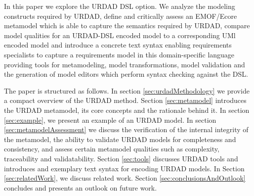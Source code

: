 In this paper we explore the URDAD DSL option. We analyze the modeling constructs required by URDAD, define and critically assess an EMOF/Ecore metamodel which is able to capture the semantics required by URDAD, compare model qualities for an URDAD-DSL encoded model to a corresponding UMl encoded model and introduce a concrete text syntax enabling requirements specialists to capture a requirements model in this domain-specific language providing tools for metamodeling, model transformations, model validation and the generation of model editors which perform syntax checking against the DSL.

The paper is structured as follows. In section \ref{sec:urdadMethodology} we provide a compact overview of the URDAD method. Section \ref{sec:metamodel} introduces the URDAD metamodel, its core concepts and the rationale behind it. In section \ref{sec:example}, we present an example of an URDAD model. In section \ref{sec:metamodelAssessment} we discuss the verification of the internal integrity of the metamodel, the ability to validate URDAD models for completeness and consistency, and assess certain metamodel qualities such as complexity, traceability and validatability. Section \ref{sec:tools} discusses URDAD tools and introduces and exemplary text syntax for encoding URDAD models. In Section \ref{sec:relatedWork}, we discuss related work. Section \ref{sec:conclusionsAndOutlook} concludes and presents an outlook on future work.
